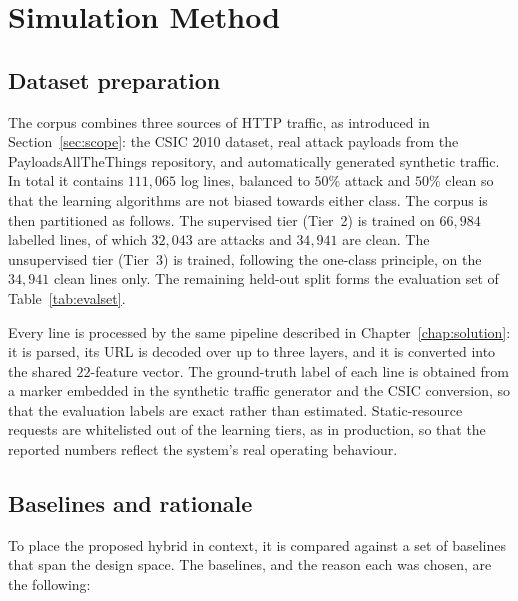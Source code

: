 \documentclass[12pt,a4paper]{report}
\begin{document}
\section{Simulation Method}
\label{sec:sim-method}

\subsection{Dataset preparation}
\label{sec:sim-data}

The corpus combines three sources of HTTP traffic, as introduced in
Section~\ref{sec:scope}: the CSIC 2010 dataset, real attack payloads from the
PayloadsAllTheThings repository, and automatically generated synthetic
traffic. In total it contains $111{,}065$ log lines, balanced to $50\%$
attack and $50\%$ clean so that the learning algorithms are not biased
towards either class. The corpus is then partitioned as follows. The
supervised tier (Tier~2) is trained on $66{,}984$ labelled lines, of which
$32{,}043$ are attacks and $34{,}941$ are clean. The unsupervised tier
(Tier~3) is trained, following the one-class principle, on the
$34{,}941$ clean lines only. The remaining held-out split forms the
evaluation set of Table~\ref{tab:evalset}.

Every line is processed by the same pipeline described in
Chapter~\ref{chap:solution}: it is parsed, its URL is decoded over up to
three layers, and it is converted into the shared $22$-feature vector. The
ground-truth label of each line is obtained from a marker embedded in the
synthetic traffic generator and the CSIC conversion, so that the evaluation
labels are exact rather than estimated. Static-resource requests are
whitelisted out of the learning tiers, as in production, so that the
reported numbers reflect the system's real operating behaviour.

\subsection{Baselines and rationale}
\label{sec:sim-baselines}

To place the proposed hybrid in context, it is compared against a set of
baselines that span the design space. The baselines, and the reason each was
chosen, are the following:
\end{document}
